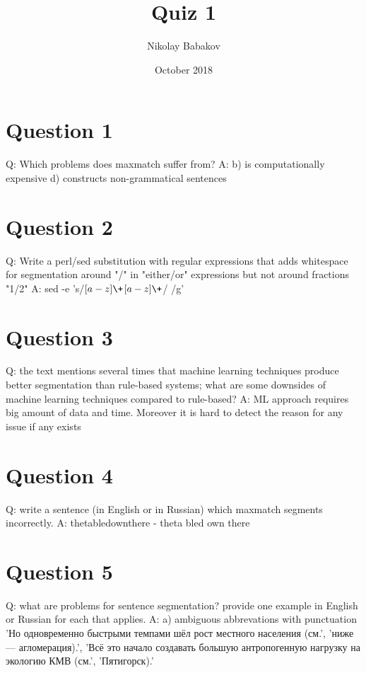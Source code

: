 \documentclass{article}
\title{Quiz 1}
\author{Nikolay Babakov}
\date{October 2018}
\begin{document}
\maketitle

\section{Question 1}
Q: Which problems does maxmatch suffer from?\newline
A: b) is computationally expensive
d) constructs non-grammatical sentences

\section{Question 2}
Q: Write a perl/sed substitution with regular expressions that adds whitespace for segmentation around "/" in "either/or" expressions but not around fractions "1/2"\newline
A: sed -e 's/\([a-z]\+\)\/\([a-z]\+\)/\1 \/ \2/g'

\section{Question 3}
Q: the text mentions several times that machine learning techniques produce better segmentation than rule-based systems; what are some downsides of machine learning techniques compared to rule-based?\newline
A: ML approach requires big amount of data and time. Moreover it is hard to detect the reason for any issue if any exists

\section{Question 4}
Q: write a sentence (in English or in Russian) which maxmatch segments incorrectly.\newline
A: thetabledownthere - theta bled own there

\section{Question 5}
Q: what are problems for sentence segmentation? provide one example in English or Russian for each that applies.\newline
A: a) ambiguous abbrevations with punctuation\newline
'Но одновременно быстрыми темпами шёл рост местного населения (см.',\newline
'ниже— агломерация).',\newline
'Всё это начало создавать большую антропогенную нагрузку на экологию КМВ (см.', 'Пятигорск).'\newline
\end{document}
